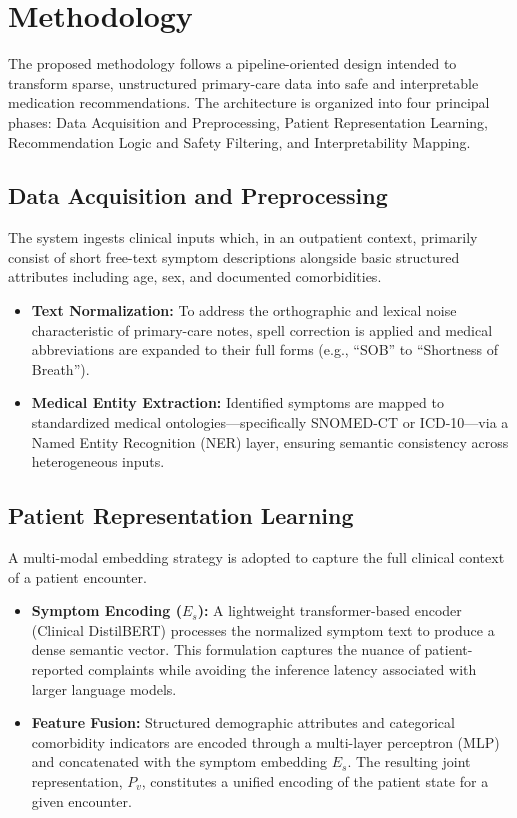 \section{Methodology}
The proposed methodology follows a pipeline-oriented design intended to transform sparse, unstructured primary-care data into safe and interpretable medication recommendations. The architecture is organized into four principal phases: Data Acquisition and Preprocessing, Patient Representation Learning, Recommendation Logic and Safety Filtering, and Interpretability Mapping.

\subsection{Data Acquisition and Preprocessing}
The system ingests clinical inputs which, in an outpatient context, primarily consist of short free-text symptom descriptions alongside basic structured attributes including age, sex, and documented comorbidities.
\begin{itemize}
    \item \textbf{Text Normalization:} To address the orthographic and lexical noise characteristic of primary-care notes, spell correction is applied and medical abbreviations are expanded to their full forms (e.g., ``SOB'' to ``Shortness of Breath'').
    \item \textbf{Medical Entity Extraction:} Identified symptoms are mapped to standardized medical ontologies---specifically SNOMED-CT or ICD-10---via a Named Entity Recognition (NER) layer, ensuring semantic consistency across heterogeneous inputs.
\end{itemize}

\subsection{Patient Representation Learning}
A multi-modal embedding strategy is adopted to capture the full clinical context of a patient encounter.
\begin{itemize}
    \item \textbf{Symptom Encoding ($E_s$):} A lightweight transformer-based encoder (Clinical DistilBERT) processes the normalized symptom text to produce a dense semantic vector. This formulation captures the nuance of patient-reported complaints while avoiding the inference latency associated with larger language models.
    \item \textbf{Feature Fusion:} Structured demographic attributes and categorical comorbidity indicators are encoded through a multi-layer perceptron (MLP) and concatenated with the symptom embedding $E_s$. The resulting joint representation, $P_v$, constitutes a unified encoding of the patient state for a given encounter.
\end{itemize}

